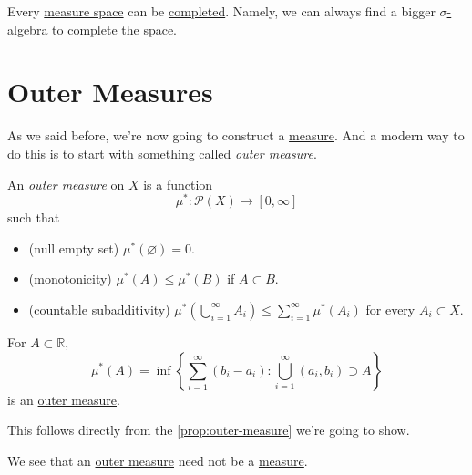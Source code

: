 \begin{exercise}
	Every \hyperref[def:measurable-space]{measure space} can be \hyperref[def:complete-measure-space]{completed}. Namely, we can always find a bigger \hyperref[def:sigma-algebra]{\(\sigma\)-algebra} to \hyperref[def:complete-measure-space]{complete} the space.
\end{exercise}

\section{Outer Measures}
As we said before, we're now going to construct a \hyperref[def:measure]{measure}. And a modern way to do this is to start with something called \emph{\hyperref[def:outer-measure]{outer measure}}.

\begin{definition}\label{def:outer-measure}
	An \emph{outer measure} on \(X\) is a function
	\[
		\mu^{\ast} \colon \mathcal{P} (X)\to [0, \infty ]
	\]
	such that
	\begin{itemize}
		\item\label{def:outer-measure-null-empty-set}(null empty set) \(\mu^{\ast} (\varnothing ) = 0\).
		\item\label{def:outer-measure-montonicity}(monotonicity) \(\mu^{\ast} (A)\leq \mu^{\ast} (B)\) if \(A\subset B\).
		\item\label{def:outer-measure-countable-subadditivity}(countable subadditivity) \(\mu^{\ast} \left(\bigcup_{i=1}^{\infty} A_{i}\right) \leq \sum_{i=1}^{\infty} \mu^{\ast} (A_{i})\) for every \(A_{i} \subset X \).
	\end{itemize}
\end{definition}

\begin{eg}
	For \(A\subset\mathbb{R} \),
	\[
		\mu^{\ast} (A) = \inf \left\{\sum_{i=1}^{\infty} (b_{i} - a_{i}) \colon \bigcup_{i=1}^{\infty} (a_{i}, b_{i})\supset A\right\}
	\]
	is an \hyperref[def:outer-measure]{outer measure}.
\end{eg}
\begin{explanation}
	This follows directly from the \autoref{prop:outer-measure} we're going to show.
\end{explanation}

\begin{remark}
	We see that an \hyperref[def:outer-measure]{outer measure} need not be a \hyperref[def:measure]{measure}.
\end{remark}

